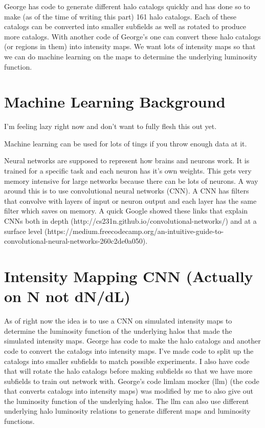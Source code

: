 \documentclass{article}
\begin{document}
		George has code to generate different halo catalogs quickly and has done so to make (as of the time of writing this part) 161 halo catalogs.  Each of these catalogs can be converted into smaller subfields as well as rotated to produce more catalogs.  With another code of George's one can convert these halo catalogs (or regions in them) into intensity maps.  We want lots of intensity maps so that we can do machine learning on the maps to determine the underlying luminosity function.

	\section{Machine Learning Background} \label{sec:MLback}

		I'm feeling lazy right now and don't want to fully flesh this out yet.

		Machine learning can be used for lots of tings if you throw enough data at it.  

		Neural networks are supposed to represent how brains and neurons work.  It is trained for a specific task and each neuron has it's own weights.  This gets very memory intensive for large networks because there can be lots of neurons.  A way around this is to use convolutional neural networks (CNN).  A CNN has filters that convolve with layers of input or neuron output and each layer has the same filter which saves on memory.  A quick Google showed these links that explain CNNs both in depth (http://cs231n.github.io/convolutional-networks/) and at a surface level (https://medium.freecodecamp.org/an-intuitive-guide-to-convolutional-neural-networks-260c2de0a050).

	\section{Intensity Mapping CNN (Actually on N not dN/dL)} \label{sec:cnn}

		As of right now the idea is to use a CNN on simulated intensity maps to determine the luminosity function of the underlying halos that made the simulated intensity maps.  George has code to make the halo catalogs and another code to convert the catalogs into intensity maps.  I've made code to split up the catalogs into smaller subfields to match possible experiments.  I also have code that will rotate the halo catalogs before making subfields so that we have more subfields to train out network with.  George's code limlam mocker (llm) (the code that converts catalogs into intensity maps) was modified by me to also give out the luminosity function of the underlying halos.  The llm can also use different underlying halo luminosity relations to generate different maps and luminosity functions.
\end{document}
